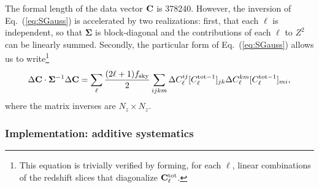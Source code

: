 \documentclass[aps,prd, amsmath,amssymb,superscriptaddress,showkeys,nofootinbib,reprint,preprintnumbers]{revtex4-1}
\begin{document}
\begin{widetext}
The formal length of the data vector ${\bf C}$ is 378240. However, the
inversion of Eq.~(\ref{eq:SGauss}) is accelerated by two realizations:
first, that each $\ell$ is independent, so that ${\boldsymbol\Sigma}$
is block-diagonal and the contributions of each $\ell$ to $Z^2$ can be
linearly summed. Secondly, the particular form of
Eq.~(\ref{eq:SGauss}) allows us to write\footnote{This equation is
trivially verified by forming, for each $\ell$, linear combinations of
the redshift slices that diagonalize ${\bf C}^{\rm tot}_\ell$.}
\begin{equation}
\Delta{\bf C} \cdot {\boldsymbol\Sigma}^{-1} \Delta {\bf C}
 = \sum_\ell \frac{(2\ell+1)f_{\rm sky}}2 \sum_{ijkm}
 \Delta C_\ell^{ij} [C^{{\rm tot}-1}_\ell]_{jk}
 \Delta C_\ell^{km} [C^{{\rm tot}-1}_\ell]_{mi},
\label{eq:sprodform}
\end{equation}
where the matrix inverses are $N_z\times N_z$.

\begin{table}
\caption{The effective number density in each redshift bin, in units of galaxies/arcmin$^{2}$, used for setting requirements. These are {\em per bin}, i.e.\ are $dn_{\rm eff}/dz\times\Delta z$. 
\label{tab:dNdz}}
\end{table}

\subsubsection{Implementation: additive systematics}
\label{ss:implement-add}


\end{widetext}
\end{document}
